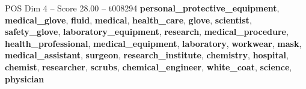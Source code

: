 \begin{textsample}{POS Dim 4 – Score 28.00 – t008294}  \label{ex:f4_pos_038}
\textbf{personal\_protective\_equipment}, \textbf{medical\_glove}, \textbf{fluid}, \textbf{medical}, \textbf{health\_care}, \textbf{glove}, \textbf{scientist}, \textbf{safety\_glove}, \textbf{laboratory\_equipment}, \textbf{research}, \textbf{medical\_procedure}, \textbf{health\_professional}, \textbf{medical\_equipment}, \textbf{laboratory}, \textbf{workwear}, \textbf{mask}, \textbf{medical\_assistant}, \textbf{surgeon}, \textbf{research\_institute}, \textbf{chemistry}, \textbf{hospital}, \textbf{chemist}, \textbf{researcher}, \textbf{scrubs}, \textbf{chemical\_engineer}, \textbf{white\_coat}, \textbf{science}, \textbf{physician}

\end{textsample}
